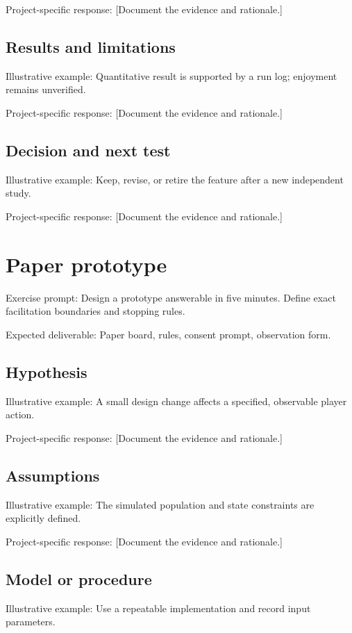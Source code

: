 \documentclass[11pt]{article}
\begin{document}
Project-specific response: [Document the evidence and rationale.]


\subsection{Results and limitations}
Illustrative example: Quantitative result is supported by a run log; enjoyment remains unverified.

Project-specific response: [Document the evidence and rationale.]


\subsection{Decision and next test}
Illustrative example: Keep, revise, or retire the feature after a new independent study.

Project-specific response: [Document the evidence and rationale.]


\section{Paper prototype}
Exercise prompt: Design a prototype answerable in five minutes. Define exact facilitation boundaries and stopping rules.

Expected deliverable: Paper board, rules, consent prompt, observation form.


\subsection{Hypothesis}
Illustrative example: A small design change affects a specified, observable player action.

Project-specific response: [Document the evidence and rationale.]


\subsection{Assumptions}
Illustrative example: The simulated population and state constraints are explicitly defined.

Project-specific response: [Document the evidence and rationale.]


\subsection{Model or procedure}
Illustrative example: Use a repeatable implementation and record input parameters.
\end{document}
